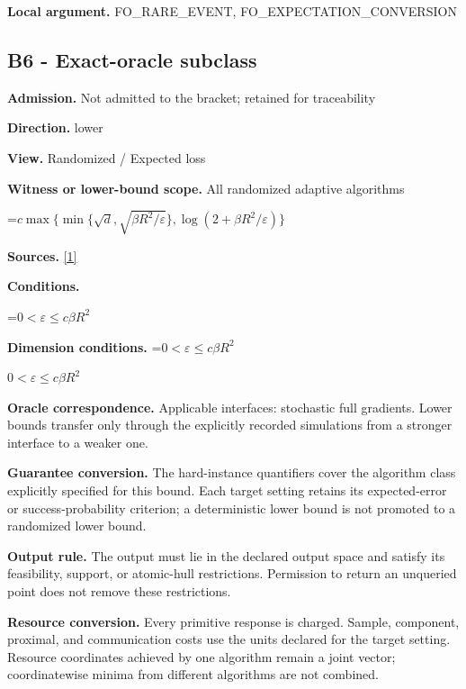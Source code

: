 \documentclass[10pt,a4paper]{article}
\newcommand{\AtlasMath}[1]{\par\begingroup\centering\setbox0=\hbox{$\displaystyle #1$}\ifdim\wd0>1.4\linewidth\typeout{ATLAS WIDE FORMULA: \the\wd0}\fi\ifdim\wd0>\linewidth\resizebox{\linewidth}{!}{\box0}\else\box0\fi\par\endgroup}
\newcommand{\AtlasInlineMath}[1]{\begingroup\setbox0=\hbox{$#1$}\ifdim\wd0>.4\linewidth\endgroup\AtlasMath{#1}\else\endgroup$#1$\fi}
\begin{document}
\textbf{Local argument.} FO\_RARE\_EVENT, FO\_EXPECTATION\_CONVERSION



\subsection{B6 - Exact-oracle subclass}


\textbf{Admission.} Not admitted to the bracket; retained for traceability



\textbf{Direction.} lower



\textbf{View.} Randomized / Expected loss



\textbf{Witness or lower-bound scope.} All randomized adaptive algorithms



\AtlasMath{c\max\{\min\{\sqrt d,\sqrt{\beta R^2/\varepsilon}\},\log(2+\beta R^2/\varepsilon)\}}


\textbf{Sources.} \href{https://arxiv.org/pdf/2609.10874}{[1]}



\textbf{Conditions.}
\AtlasMath{0<\varepsilon\le c\beta R^2}




\textbf{Dimension conditions.} \AtlasInlineMath{0<\varepsilon\le c\beta R^2}



\textbf{Oracle correspondence.} Applicable interfaces: stochastic full gradients. Lower bounds transfer only through the explicitly recorded simulations from a stronger interface to a weaker one.



\textbf{Guarantee conversion.} The hard-instance quantifiers cover the algorithm class explicitly specified for this bound. Each target setting retains its expected-error or success-probability criterion; a deterministic lower bound is not promoted to a randomized lower bound.



\textbf{Output rule.} The output must lie in the declared output space and satisfy its feasibility, support, or atomic-hull restrictions. Permission to return an unqueried point does not remove these restrictions.



\textbf{Resource conversion.} Every primitive response is charged. Sample, component, proximal, and communication costs use the units declared for the target setting. Resource coordinates achieved by one algorithm remain a joint vector; coordinatewise minima from different algorithms are not combined.
\end{document}

